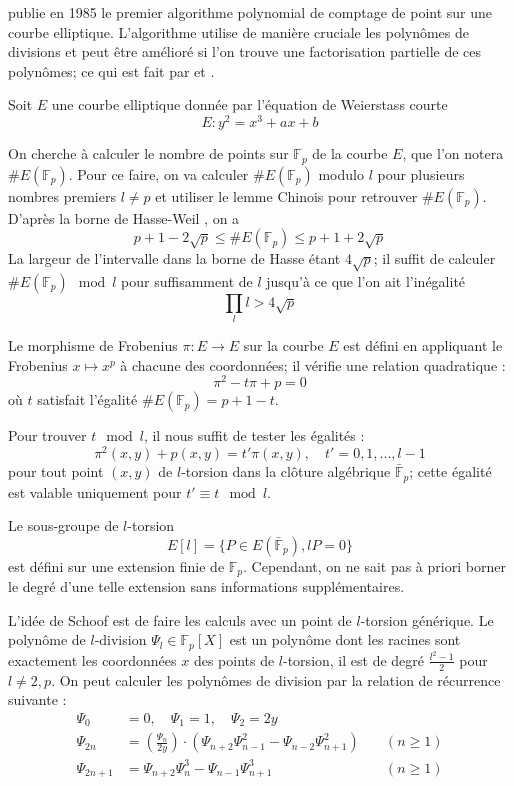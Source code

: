 \documentclass[a4paper,12pt]{article}
\theoremstyle{definition}
\theoremstyle{remark}
\numberwithin{equation}{section}
\begin{document}
\citet{schoof} publie en 1985 le premier algorithme polynomial de comptage de point sur une courbe elliptique. L'algorithme utilise de manière cruciale les polynômes de divisions et peut être amélioré si l'on trouve une factorisation partielle de ces polynômes; ce qui est fait par \citet{atkin} et \citet{elkies}.

Soit $E$ une courbe elliptique donnée par l'équation de Weierstass courte
$$E : y^2 = x^3 + ax + b$$

On cherche à calculer le nombre de points sur $\mathbb{F}_p$ de la courbe $E$, que l'on notera $\#E(\mathbb{F}_p)$. Pour ce faire, on va calculer $\#E(\mathbb{F}_p)$ modulo $l$ pour plusieurs nombres premiers $l \neq p$ et utiliser le lemme Chinois pour retrouver $\#E(\mathbb{F}_p)$. D'après la borne de Hasse-Weil \citep{weil}, on a
$$p+1 - 2\sqrt{p} \leq \#E(\mathbb{F}_p) \leq p+1 + 2\sqrt{p}$$
La largeur de l'intervalle dans la borne de Hasse étant $4\sqrt{p}$; il suffit de calculer $\#E(\mathbb{F}_p) \mod l$ pour suffisamment de $l$ jusqu'à ce que l'on ait l'inégalité
\begin{equation}
\label{inegaliteSchoof}
\prod_l l > 4\sqrt{p}
\end{equation}

Le morphisme de Frobenius $\pi : E \longrightarrow E$ sur la courbe $E$ est défini en appliquant le Frobenius $x \mapsto x^p$ à chacune des coordonnées; il vérifie une relation quadratique :
$$\pi^2 - t\pi + p = 0$$
où $t$ satisfait l'égalité $\#E(\mathbb{F}_p) = p + 1 - t$.

Pour trouver $t \mod l$, il nous suffit de tester les égalités :
$$\pi^2(x,y) + p(x,y) = t'\pi(x,y), \quad t' = 0,1,...,l-1$$
pour tout point $(x,y)$ de $l$-torsion dans la clôture algébrique $\bar{\mathbb{F}}_p$; cette égalité est valable uniquement pour $t' \equiv t \mod l$.

Le sous-groupe de $l$-torsion
$$E[l] = \{P \in E(\bar{\mathbb{F}}_p), lP = 0\}$$
est défini sur une extension finie de $\mathbb{F}_p$. Cependant, on ne sait pas à priori borner le degré d'une telle extension sans informations supplémentaires.

L'idée de Schoof est de faire les calculs avec un point de $l$-torsion générique. Le polynôme de $l$-division $\Psi_l \in \mathbb{F}_p[X]$ est un polynôme dont les racines sont exactement les coordonnées $x$ des points de $l$-torsion, il est de degré $\frac{l^2-1}{2}$ pour $l \neq 2,p$. On peut calculer les polynômes de division par la relation de récurrence suivante :
\begin{align*}
\Psi_{0} &= 0, \quad \Psi_{1} = 1, \quad \Psi_{2} = 2y \\
\Psi_{2n} &=  \left ( \frac { \Psi_{n}}{2y} \right ) \cdot ( \Psi_{n+2}\Psi^{2}_{n-1} -  \Psi_{n-2} \Psi ^{2}_{n+1})  \quad &(n \geq 1) \\
\Psi_{2n+1} &=  \Psi_{n+2} \Psi_{n}^{ 3}  -  \Psi_{n-1} \Psi ^{3}_{n+1} \quad &(n \geq 1)
\end{align*}
\end{document}

